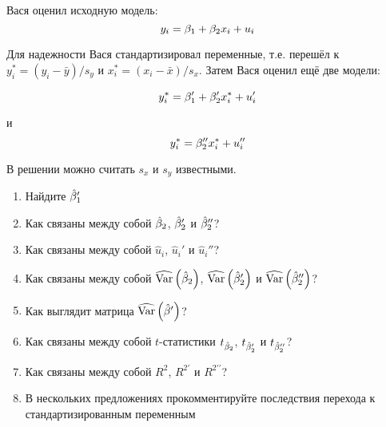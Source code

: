 \begin{problem}
Вася оценил исходную модель:
\[
y_i=\beta_1+\beta_2 x_i + u_i
\]

Для надежности Вася стандартизировал переменные, т.е. перешёл к $y_i^*=(y_i-\bar{y})/s_y$ и $x_i^*=(x_i-\bar{x})/s_x$. Затем Вася оценил ещё две модели:

\[
y_i^*=\beta_1'+\beta_2' x^*_i + u_i'
\]

и 
\[
y_i^*=\beta_2'' x^*_i + u_i''
\]

В решении можно считать $s_x$ и $s_y$ известными.
 
\begin{enumerate}
\item Найдите $\hat{\beta}_1'$
\item Как связаны между собой $\hat{\beta}_2$, $\hat{\beta}_2'$ и $\hat{\beta}_2''$? 
\item Как связаны между собой $\hat{u}_i$, $\hat{u}_i'$ и $\hat{u}_i''$?
\item Как связаны между собой $\widehat{\operatorname{Var}}\left(\hat{\beta}_2\right)$, $\widehat{\operatorname{Var}}\left(\hat{\beta}_2'\right)$ и $\widehat{\operatorname{Var}}\left(\hat{\beta}_2''\right)$?
\item Как выглядит матрица $\widehat{\operatorname{Var}}\left(\hat{\beta}'\right)$?
\item Как связаны между собой $t$-статистики $t_{\hat{\beta}_2}$, $t_{\hat{\beta}_2'}$ и $t_{\hat{\beta}_2''}$?
\item Как связаны между собой $R^2$, $R^{2\prime}$ и $R^{2\prime\prime}$?
\item В нескольких предложениях прокомментируйте последствия перехода к стандартизированным переменным
\end{enumerate}
\end{problem}
\begin{solution}
\end{solution}



